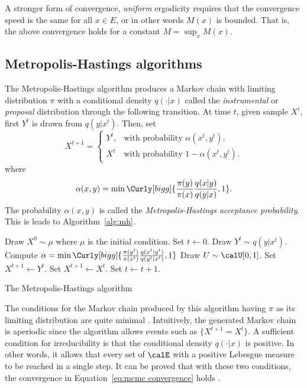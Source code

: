 A stronger form of convergence, \emph{uniform} ergodicity requires that the
convergence speed is the same for all $x\in E$, or in other words $M(x)$ is
bounded. That is, the above convergence holds for a constant $M = \sup_x
M(x)$.

\subsection{Metropolis-Hastings algorithms}
\label{sub:Metropolis-Hastings algorithms}

The Metropolis-Hastings algorithm produces a Markov chain with limiting
distribution $\pi$ with a conditional density $q(\cdot|x)$ called the
\emph{instrumental} or \emph{proposal} distribution through the following
transition. At time $t$, given sample $X^t$, first $Y^t$ is drawn from
$q(y|x^t)$. Then, set
\begin{equation*}
  X^{t+1} =
  \begin{cases}
    Y^t, &\text{with probability } \alpha(x^t,y^t),\\
    X^t  &\text{with probability } 1 - \alpha(x^t,y^t).
  \end{cases}
\end{equation*}
where
\begin{equation}
  \alpha(x,y) =
  \min\Curly[bigg]{\frac{\pi(y)}{\pi(x)}\frac{q(x|y)}{q(y|x)},1}.
\end{equation}
The probability $\alpha(x,y)$ is called the \emph{Metropolis-Hastings
  acceptance probability}. This is leads to Algorithm~\ref{alg:mh}.

\begin{algorithm}
\begin{algorithmic}
  \tophrule
  \STATE Draw $X^0\sim\mu$ where $\mu$ is the initial condition.
  \STATE Set $t\leftarrow0$.
  \REPEAT
    \STATE Draw $Y^t\sim q(y|x^t)$.
    \STATE Compute $\alpha = \min\Curly[bigg]{
      \frac{\pi(y^t)}{\pi(x^t)}\frac{q(x^t|y^t)}{q(y^t|x^t)}, 1}$
    \STATE Draw $U\sim\calU[0,1]$.
      \STATE Set $X^{t+1}\leftarrow Y^t$.
    \ELSE
      \STATE Set $X^{t+1}\leftarrow X^t$.
    \ENDIF
    \STATE Set $t\leftarrow t+1$.
  \bottomhrule
\end{algorithmic}
\caption{The Metropolis-Hastings algorithm}
\label{alg:mh}
\end{algorithm}

The conditions for the Markov chain produced by this algorithm having $\pi$ as
its limiting distribution are quite minimal
\cite[][sec.~7.3.2]{Robert:2004tn}. Intuitively, the generated Markov chain is
aperiodic since the algorithm allows events such as $\{X^{t+1} = X^t\}$. A
sufficient condition for irreducibility is that the conditional density
$q(\cdot|x)$ is positive. In other words, it allows that every set of $\calE$
with a positive Lebesgue measure to be reached in a single step. It can be
proved that with these two conditions, the convergence in
Equation~\eqref{eq:mcmc convergence} holds \cite[][Theorem~7.4 and
Corollary~7.5]{Robert:2004tn}.

